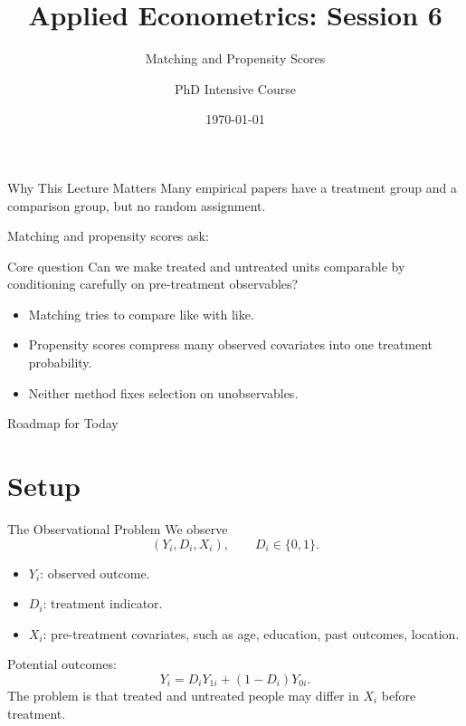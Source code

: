 \documentclass[11pt,aspectratio=169]{beamer}
\title{Applied Econometrics: Session 6}
\subtitle{Matching and Propensity Scores}
\author{PhD Intensive Course}
\institute{Lecture 6}
\date{\today}
\newcommand{\derivbutton}[1]{\vspace{0.4em}\hfill\hyperlink{app:#1}{\beamerbutton{Appendix details}}}
\begin{document}
\begin{frame}
  \titlepage
\end{frame}

\begin{frame}{Why This Lecture Matters}
  Many empirical papers have a treatment group and a comparison group, but no random assignment.
  \vspace{0.4em}

  Matching and propensity scores ask:
  \begin{block}{Core question}
    Can we make treated and untreated units comparable by conditioning carefully on pre-treatment observables?
  \end{block}

  \begin{itemize}
    \item Matching tries to compare like with like.
    \item Propensity scores compress many observed covariates into one treatment probability.
    \item Neither method fixes selection on unobservables.
  \end{itemize}
\end{frame}

\begin{frame}{Roadmap for Today}
  \tableofcontents
\end{frame}

\section{Setup}

\begin{frame}{The Observational Problem}
  \hypertarget{main:setup}{}
  We observe
  \[
    (Y_i,D_i,X_i), \qquad D_i\in\{0,1\}.
  \]
  \begin{itemize}
    \item \(Y_i\): observed outcome.
    \item \(D_i\): treatment indicator.
    \item \(X_i\): pre-treatment covariates, such as age, education, past outcomes, location.
  \end{itemize}
  Potential outcomes:
  \[
    Y_i = D_iY_{1i}+(1-D_i)Y_{0i}.
  \]
  The problem is that treated and untreated people may differ in \(X_i\) before treatment.
  \derivbutton{cia-matching}
\end{frame}
\end{document}
